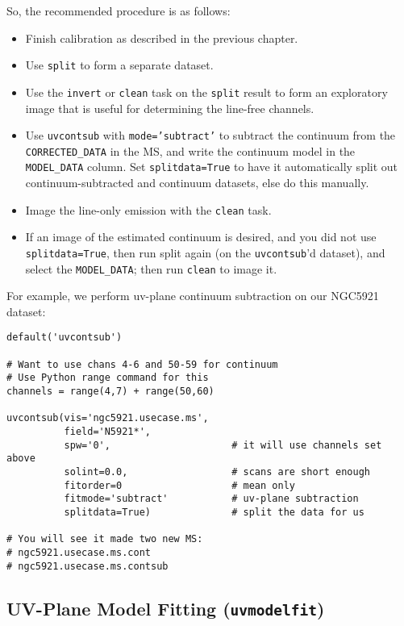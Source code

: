 So, the recommended procedure is as follows: 

\begin{itemize}
   \item Finish calibration as described in the previous chapter.
   \item Use {\tt split} to form a separate dataset.
   \item Use the {\tt invert} or {\tt clean} task on the {\tt split}
         result to form an exploratory image that is useful for
         determining the line-free channels.
   \item Use {\tt uvcontsub} with {\tt mode='subtract'} to subtract
         the continuum from the {\tt CORRECTED\_DATA} in the MS,
         and write the continuum model in the {\tt MODEL\_DATA} column.
         Set {\tt splitdata=True} to have it automatically split out
         continuum-subtracted and continuum datasets, else do this 
         manually.         
   \item Image the line-only emission with the {\tt clean} task.
   \item If an image of the estimated continuum is desired, and
         you did not use {\tt splitdata=True}, then run split
         again (on the {\tt uvcontsub}'d dataset), and select the 
         {\tt MODEL\_DATA}; then run {\tt clean} to image it.
\end{itemize}

For example, we perform uv-plane continuum subtraction on our
NGC5921 dataset:
\small
\begin{verbatim}
default('uvcontsub')

# Want to use chans 4-6 and 50-59 for continuum
# Use Python range command for this
channels = range(4,7) + range(50,60)

uvcontsub(vis='ngc5921.usecase.ms',
          field='N5921*',
          spw='0',                     # it will use channels set above
          solint=0.0,                  # scans are short enough
          fitorder=0                   # mean only
          fitmode='subtract'           # uv-plane subtraction
          splitdata=True)              # split the data for us

# You will see it made two new MS:
# ngc5921.usecase.ms.cont
# ngc5921.usecase.ms.contsub
\end{verbatim}
\normalsize

\subsection{UV-Plane Model Fitting ({\tt uvmodelfit})}
\label{section:cal.other.uvmodelfit}

